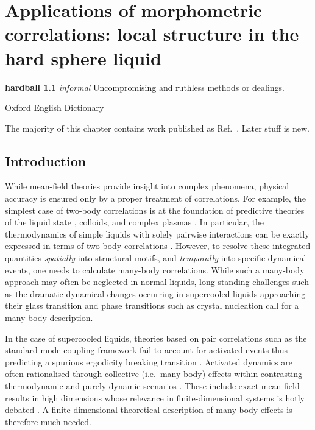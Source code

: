 \documentclass[11pt,twoside]{report}
\begin{document}
\chapter{Applications of morphometric correlations: local structure in the hard sphere liquid}
\epigraph{\textbf{hardball 1.1} \emph{informal} Uncompromising and ruthless methods or dealings.}{Oxford English Dictionary}
\label{chapter:morphometric-applications}

The majority of this chapter contains work published as Ref.\ \cite{RobinsonPRL2019}.
Later stuff is new.

\section{Introduction}

While mean-field theories provide insight into complex phenomena, physical accuracy is ensured only by a proper treatment of correlations.
For example, the simplest case of two-body correlations is at the foundation of predictive theories of the liquid state \cite{Hansen2013}, colloids, and complex plasmas \cite{LikosPR2001,Ivlev2012}.
In particular, the thermodynamics of simple liquids with solely pairwise interactions can be exactly expressed in terms of two-body correlations \cite{Hansen2013}.
However, to resolve these integrated quantities \emph{spatially} into structural motifs, and \emph{temporally} into specific dynamical events, one needs to calculate many-body correlations.
While such a many-body approach may often be neglected in normal liquids, long-standing challenges such as the dramatic dynamical changes occurring in supercooled liquids approaching their glass transition \cite{BerthierRMP2011,RoyallPR2015} and phase transitions such as crystal nucleation \cite{RussoSR2012} call for a many-body description.

In the case of supercooled liquids, theories based on pair correlations such as the standard mode-coupling framework \cite{goetze} fail to account for activated events thus predicting a spurious ergodicity breaking transition \cite{BrambillaPRL2009,HallettNC2018}.
Activated dynamics are often rationalised through collective (i.e.\ many-body) effects within contrasting thermodynamic and purely dynamic scenarios \cite{LubchenkoARPC2007,TarjusJPCM2005,BiroliPRL2006,JanssenPRL2015,SzamelPTEP2013,ChandlerARPC2010}.
These include exact mean-field results in high dimensions \cite{ParisiRMP2010,CharbonneauARCMP2017} whose relevance in finite-dimensional systems is hotly debated \cite{WyartPRL2017}.
A finite-dimensional theoretical description of many-body effects is therefore much needed.
\end{document}
